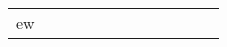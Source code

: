 \documentclass[runningheads]{llncs}
\begin{document}
\begin{table}[!ht]
\begin{tabular}{|p{7em}|p{2.5em}|p{2.5em}|p{3em}|p{2.5em}|p{3em}|p{2.5em}|p{3em}|p{2.5em}|p{3em}|p{2.5em}|p{3em}|}
ew
\end{tabular}
\end{table}
\end{document}
